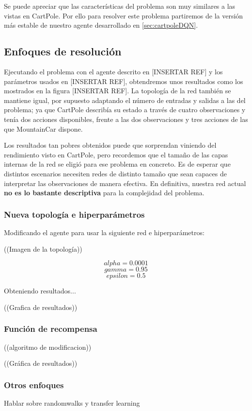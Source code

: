 Se puede apreciar que las características del problema son muy similares a las vistas en CartPole. Por ello para resolver este problema partiremos de la versión más estable de nuestro agente desarrollado en \ref{sec:cartpoleDQN}.


\subsection{Enfoques de resolución}

Ejecutando el problema con el agente descrito en [INSERTAR REF] y los parámetros usados en [INSERTAR REF], obtendremos unos resultados como los mostrados en la figura [INSERTAR REF]. La topología de la red también se mantiene igual, por supuesto adaptando el número de entradas y salidas a las del problema; ya que CartPole describía su estado a través de cuatro observaciones y tenía dos acciones disponibles, frente a las dos observaciones y tres acciones de las que MountainCar dispone.

Los resultados tan pobres obtenidos puede que sorprendan viniendo del rendimiento visto en CartPole, pero recordemos que el tamaño de las capas internas de la red se eligió para ese problema en concreto. Es de esperar que distintos escenarios necesiten redes de distinto tamaño que sean capaces de interpretar las observaciones de manera efectiva. En definitiva, nuestra red actual \textbf{no es lo bastante descriptiva} para la complejidad del problema.

\subsubsection*{Nueva topología e hiperparámetros}
Modificando el agente para usar la siguiente red e hiperparámetros:

((Imagen de la topología))

$$ alpha = 0.0001$$
$$ gamma = 0.95$$
$$ epsilon = 0.5$$
$$  $$

Obteniendo resultados... 

((Grafica de resultados))

\subsubsection*{Función de recompensa}

((algoritmo de modificacion))

((Gráfica de resultados))

\subsubsection*{Otros enfoques}
Hablar sobre randomwalks y transfer learning